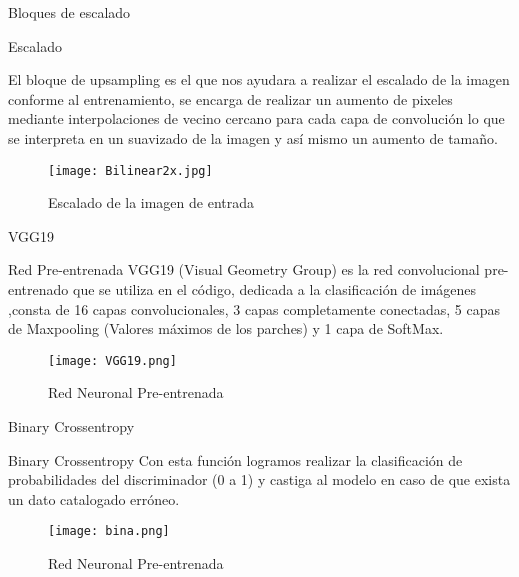 \begin{frame}{Bloques de escalado}
    \begin{block}{Escalado}
        
        El bloque de upsampling es el que nos ayudara a realizar el escalado de la imagen conforme al entrenamiento,
        se encarga de realizar un aumento de pixeles mediante interpolaciones de vecino cercano para cada 
        capa de convolución lo que se interpreta en un suavizado de la imagen y así mismo un aumento de tamaño.
    \end{block}
    \begin{figure}[H]
        \begin{center}
          \texttt{[image: Bilinear2x.jpg]}
          \caption{Escalado de la imagen de entrada}
          \label{Alexis11}
        \end{center}
    \end{figure}
     
\end{frame}

\begin{frame}{VGG19}
    
\begin{block}{Red Pre-entrenada}
    VGG19 (Visual Geometry Group) es la red convolucional pre-entrenado que se utiliza en el código,
    dedicada a la clasificación de imágenes ,consta de 16 capas convolucionales, 3 capas completamente conectadas, 5 capas de 
    Maxpooling (Valores máximos de los parches)  y 1 capa de SoftMax.
\end{block}
    \begin{figure}[H]
        \begin{center}
          \texttt{[image: VGG19.png]}
          \caption{Red Neuronal Pre-entrenada}
          \label{Alexis12}
        \end{center}
    \end{figure}
     

\end{frame}

\begin{frame}{Binary Crossentropy}
\begin{block}{Binary Crossentropy}
    Con esta función logramos realizar la clasificación de probabilidades del discriminador
    (0 a 1) y castiga al modelo en caso de que exista un dato catalogado erróneo.
\end{block}
    \begin{figure}[H]
        \begin{center}
          \texttt{[image: bina.png]}
          \caption{Red Neuronal Pre-entrenada}
          \label{Alexis12}
        \end{center}
    \end{figure}
     

\end{frame}

